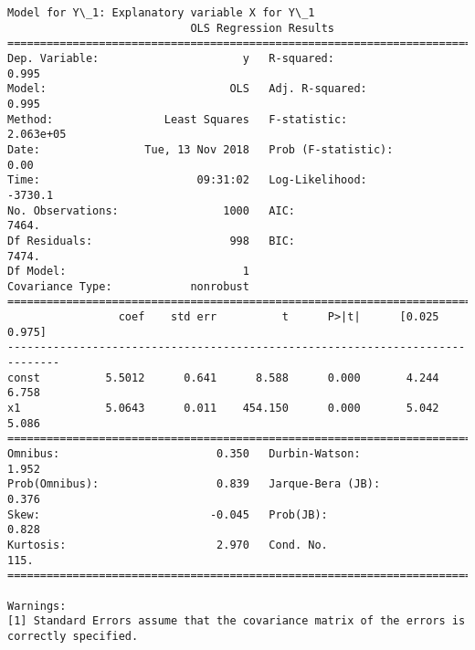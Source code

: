 \documentclass[11pt]{article}
\begin{document}
    \begin{Verbatim}[commandchars=\\\{\}]
Model for Y\_1: Explanatory variable X for Y\_1
                            OLS Regression Results                            
==============================================================================
Dep. Variable:                      y   R-squared:                       0.995
Model:                            OLS   Adj. R-squared:                  0.995
Method:                 Least Squares   F-statistic:                 2.063e+05
Date:                Tue, 13 Nov 2018   Prob (F-statistic):               0.00
Time:                        09:31:02   Log-Likelihood:                -3730.1
No. Observations:                1000   AIC:                             7464.
Df Residuals:                     998   BIC:                             7474.
Df Model:                           1                                         
Covariance Type:            nonrobust                                         
==============================================================================
                 coef    std err          t      P>|t|      [0.025      0.975]
------------------------------------------------------------------------------
const          5.5012      0.641      8.588      0.000       4.244       6.758
x1             5.0643      0.011    454.150      0.000       5.042       5.086
==============================================================================
Omnibus:                        0.350   Durbin-Watson:                   1.952
Prob(Omnibus):                  0.839   Jarque-Bera (JB):                0.376
Skew:                          -0.045   Prob(JB):                        0.828
Kurtosis:                       2.970   Cond. No.                         115.
==============================================================================

Warnings:
[1] Standard Errors assume that the covariance matrix of the errors is correctly specified.



\end{Verbatim}
\end{document}
